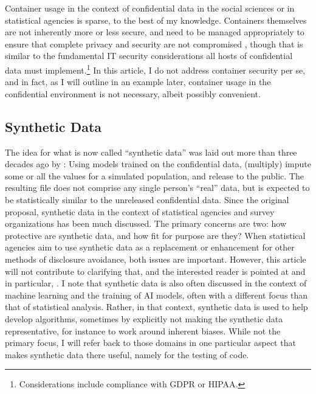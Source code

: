 \documentclass[inline]{hdsr}
\begin{document}
Container usage in the context of confidential data in the social sciences or in statistical agencies is sparse, to the best of my knowledge. Containers themselves are not inherently more or less secure, and need to be managed appropriately to ensure that complete privacy and security are not compromised \citep[see][]{souppaya_application_2017}, though that is  similar to the fundamental IT security considerations all hosts of confidential data must implement.\footnote{Considerations include compliance with \ac{GDPR} or \ac{HIPAA}.} In this article, I do not address container security per se, and in fact, as I will outline in an example later, container usage in the confidential environment is not necessary, albeit possibly convenient.  


\subsection{Synthetic Data}

The idea for what is now called ``synthetic data'' was laid out more than three decades ago by \citet{rubin_discussion_1993}: Using models trained on the confidential data, (multiply) impute some or all the values for a simulated population, and release to the public. The resulting file does not comprise any single person's ``real'' data, but is expected to be statistically similar to the unreleased confidential data. Since the original proposal, synthetic data in the context of statistical agencies and survey organizations has been much discussed. The primary concerns are two: how protective are synthetic data, and how fit for purpose are they? When statistical agencies aim to use synthetic data as a replacement or enhancement for other methods of disclosure avoidance, both issues are important. However, this article will not contribute to clarifying that, and the interested reader is pointed at \citet{drechslerDifferentialPrivacyGovernment2021,drechsler30YearsSynthetic2024,raghunathan_synthetic_2021,reiter_synthetic_2023} and in particular, \citet{raghunathan_roadmap_2023b,raghu-nber-2024}. I note that synthetic data is also often discussed in the context of machine learning and the training of AI models, often with a different focus than that of statistical analysis. Rather, in that context, synthetic data is used to help develop algorithms, sometimes by explicitly not making the synthetic data representative, for instance to work around inherent biases. While not the primary focus, I will refer back to those domains in one particular aspect that makes synthetic data there useful, namely for the testing of code. 
\end{document}
